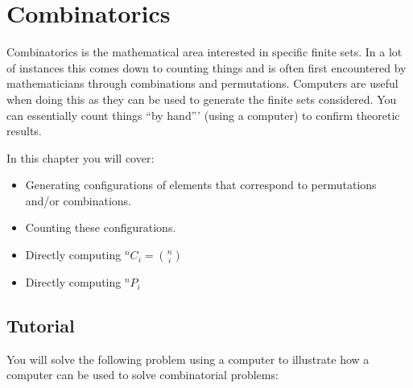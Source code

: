 \chapter{Combinatorics}
\label{\detokenize{tools-for-mathematics/05-combinations-permutations/introduction/main:combinatorics}}\label{\detokenize{tools-for-mathematics/05-combinations-permutations/introduction/main::doc}}

Combinatorics is the mathematical area interested in specific finite sets. In a lot
of instances this comes down to counting things and is often first encountered
by mathematicians through combinations and permutations.
Computers are useful when doing this as they can be used to generate the finite
sets considered. You can essentially count things ``by hand''' (using a computer)
to confirm theoretic results.


\begin{note}
In this chapter you will cover:
\begin{itemize}
\item 

Generating configurations of elements that correspond to permutations and/or
combinations.

\item 

Counting these configurations.

\item 

Directly computing \(^n C_i={n \choose i}\)

\item 

Directly computing \(^n P_i\)

\end{itemize}
\end{note}





\section{Tutorial}
\label{\detokenize{tools-for-mathematics/05-combinations-permutations/tutorial/main:tutorial}}\label{\detokenize{tools-for-mathematics/05-combinations-permutations/tutorial/main::doc}}

You will solve the following problem using a computer to illustrate how a
computer can be used to solve combinatorial problems:


